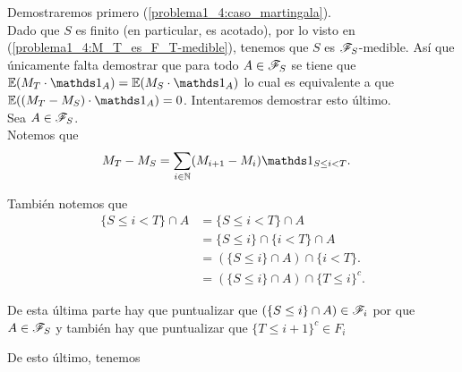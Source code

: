 	Demostraremos primero (\ref{problema1_4:caso_martingala}).\\
	
	 Dado que $S$ es finito (en particular, es acotado), por lo visto en (\ref{problema1_4:M_T_es_F_T-medible}), 
	 tenemos que $S$ es $\mathscr{F}_S$-medible. Así que únicamente falta demostrar que para todo $A \in \mathscr{F}_S$ se tiene que 
	 $\E(M_T \cdot \indic_A) = \E(M_S \cdot \indic_A)$ lo cual es equivalente a que $\E((M_T - M_S) \cdot \indic_A) = 0$.
	 Intentaremos demostrar esto último.\\
	 
	 Sea $A \in \mathscr{F}_S$.\\
	 
	 Notemos que	 
	 \begin{align}
	 	M_T - M_S &= \sum_{ i \in \N} ( M_{i+1} - M_i) \indic_{S \leq i < T }. 
	 \end{align}

	 También notemos que 
	 \begin{align}
	 	\{S \leq i < T \} \cap A 	&=		\{S \leq i < T \} \cap A 						\\
	 								&=		\{S \leq i \} \cap \{ i < T \} \cap A 			\\
	 								&=		(\{S \leq i \} \cap A) \cap \{ i < T \}.  		\\
	 								&=		(\{S \leq i \} \cap A) \cap \{ T \leq i \}^c.
	 \end{align}	 
	 
	 De esta última parte hay que puntualizar que $(\{S \leq i \} \cap A) \in \mathscr{F}_i$ por que $A \in \mathscr{F}_S$ y también
	 hay que puntualizar que $\{ T \leq i + 1 \}^c \in F_{i}$
	 
	 De esto último, tenemos
	
	
	
	